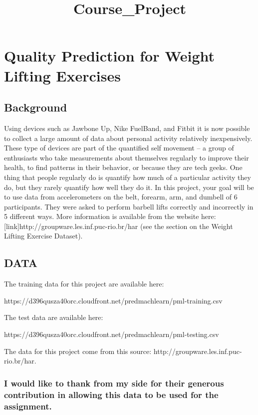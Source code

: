 \documentclass{article}
\title{Course\_Project}
\begin{document}
    
    
    \maketitle
    
    

    
    \section{Quality Prediction for Weight Lifting
Exercises}\label{quality-prediction-for-weight-lifting-exercises}

\subsection{Background}\label{background}

Using devices such as Jawbone Up, Nike FuelBand, and Fitbit it is now
possible to collect a large amount of data about personal activity
relatively inexpensively. These type of devices are part of the
quantified self movement -- a group of enthusiasts who take measurements
about themselves regularly to improve their health, to find patterns in
their behavior, or because they are tech geeks. One thing that people
regularly do is quantify how much of a particular activity they do, but
they rarely quantify how well they do it. In this project, your goal
will be to use data from accelerometers on the belt, forearm, arm, and
dumbell of 6 participants. They were asked to perform barbell lifts
correctly and incorrectly in 5 different ways. More information is
available from the website here:
{[}link{]}http://groupware.les.inf.puc-rio.br/har (see the section on
the Weight Lifting Exercise Dataset).

\subsection{DATA}\label{data}

The training data for this project are available here:

https://d396qusza40orc.cloudfront.net/predmachlearn/pml-training.csv

The test data are available here:

https://d396qusza40orc.cloudfront.net/predmachlearn/pml-testing.csv

The data for this project come from this source:
http://groupware.les.inf.puc-rio.br/har.

\subsubsection{I would like to thank from my side for their generous
contribution in allowing this data to be used for the
assignment.}\label{i-would-like-to-thank-from-my-side-for-their-generous-contribution-in-allowing-this-data-to-be-used-for-the-assignment.}
\end{document}
